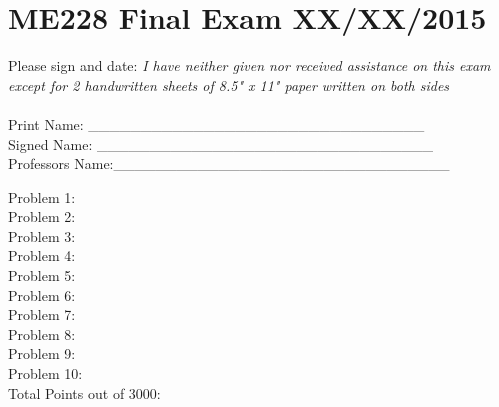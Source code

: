 \section{ME228 Final Exam XX/XX/2015}

\noindent Please sign and date: {\it I have neither given nor received
  assistance on this exam except for 2 handwritten sheets of 8.5" x 11"
  paper written on both sides}
\ \\
\ \\

\noindent Print Name: \_\_\_\_\_\_\_\_\_\_\_\_\_\_\_\_\_\_\_\_\_\_\_\_\_\_\_\_\_\_\_\_
\ \\

\noindent Signed Name: \_\_\_\_\_\_\_\_\_\_\_\_\_\_\_\_\_\_\_\_\_\_\_\_\_\_\_\_\_\_\_\_
\ \\

\noindent Professors Name:\_\_\_\_\_\_\_\_\_\_\_\_\_\_\_\_\_\_\_\_\_\_\_\_\_\_\_\_\_\_\_\_

\vspace{200pt}

Problem 1: 
\ \\

Problem 2:
\ \\

Problem 3:
\ \\

Problem 4:
\ \\

Problem 5:  
\ \\

Problem 6: 
\ \\

Problem 7:
\ \\

Problem 8:
\ \\

Problem 9:
\ \\

Problem 10: 
\ \\

Total Points out of 3000: 


